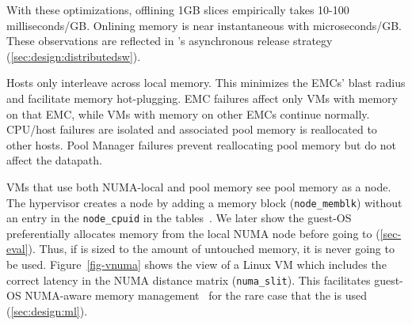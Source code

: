 {With these optimizations, offlining 1GB slices empirically takes 10-100 milliseconds\slash GB.
Onlining memory is near instantaneous with microseconds\slash GB.
These observations are reflected in \sys's asynchronous release strategy (\sec\ref{sec:design:distributedsw}).





Hosts only interleave across local memory.
This minimizes the EMCs' blast radius and facilitate memory hot-plugging.
EMC failures affect only VMs with memory on that EMC, while VMs with memory on other EMCs continue normally.
CPU\slash host failures are isolated and associated pool memory is reallocated to other
hosts.
Pool Manager failures prevent reallocating pool memory but do not affect the datapath.





VMs that use both NUMA-local and pool memory see pool memory as a \cvn node.
The hypervisor creates a \cvn node by adding a memory block (\texttt{node\_memblk}) without
an entry in the \texttt{node\_cpuid} in the
 tables~\cite{acpi}.
We later show the guest-OS preferentially allocates memory from the local NUMA node before going to \cvn (\sec\ref{sec-eval}).
Thus, if \cvn is sized to the amount of untouched memory, it is never going to be used.
Figure~\ref{fig-vnuma} shows the view of a Linux VM which includes
the correct latency in the NUMA distance
matrix (\texttt{numa\_slit}).
This facilitates guest-OS NUMA-aware memory management~\cite{nimblepage.asplos19, autonuma.web19} for the rare case that the \cvn is used (\sec\ref{sec:design:ml}).


}
